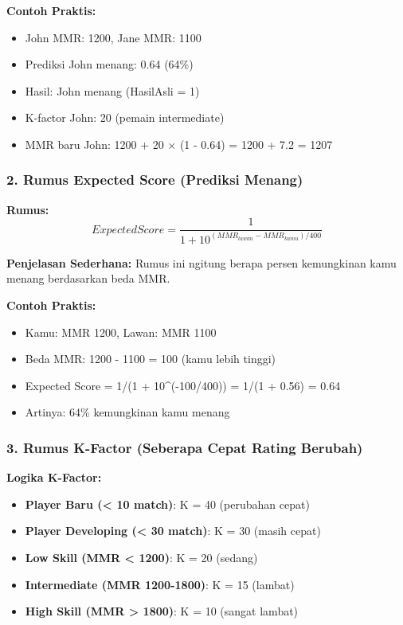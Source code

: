 \documentclass[12pt]{article}
\begin{document}
\textbf{Contoh Praktis:}
\begin{itemize}
    \item John MMR: 1200, Jane MMR: 1100
    \item Prediksi John menang: 0.64 (64\%)
    \item Hasil: John menang (HasilAsli = 1)
    \item K-factor John: 20 (pemain intermediate)
    \item MMR baru John: 1200 + 20 × (1 - 0.64) = 1200 + 7.2 = 1207
\end{itemize}

\subsubsection{2. Rumus Expected Score (Prediksi Menang)}

\textbf{Rumus:}
\begin{equation}
ExpectedScore = \frac{1}{1 + 10^{(MMR_{lawan} - MMR_{kamu})/400}}
\end{equation}

\textbf{Penjelasan Sederhana:}
Rumus ini ngitung berapa persen kemungkinan kamu menang berdasarkan beda MMR.

\textbf{Contoh Praktis:}
\begin{itemize}
    \item Kamu: MMR 1200, Lawan: MMR 1100
    \item Beda MMR: 1200 - 1100 = 100 (kamu lebih tinggi)
    \item Expected Score = 1/(1 + 10^(-100/400)) = 1/(1 + 0.56) = 0.64
    \item Artinya: 64\% kemungkinan kamu menang
\end{itemize}

\subsubsection{3. Rumus K-Factor (Seberapa Cepat Rating Berubah)}

\textbf{Logika K-Factor:}
\begin{itemize}
    \item \textbf{Player Baru (< 10 match)}: K = 40 (perubahan cepat)
    \item \textbf{Player Developing (< 30 match)}: K = 30 (masih cepat)
    \item \textbf{Low Skill (MMR < 1200)}: K = 20 (sedang)
    \item \textbf{Intermediate (MMR 1200-1800)}: K = 15 (lambat)
    \item \textbf{High Skill (MMR > 1800)}: K = 10 (sangat lambat)
\end{itemize}
\end{document}
